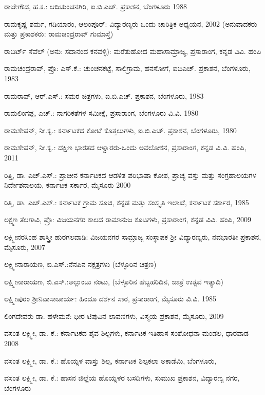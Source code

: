 \noindent
ರಾಜೇಗೌಡ, ಹ.ಕ.: ಆದಿಚುಂಚನಗಿರಿ, ಐ.ಬಿ.ಎಚ್​. ಪ್ರಕಾಶನ, ಬೆಂಗಳೂರು 1988

\noindent
ರಾಮಕೃಷ್ಣ ಶರ್ಮ, ಗಡಿಯಾರಂ, ಆಲಂಪೂರ್​: ವಿದ್ಯಾರಣ್ಯರು ಒಂದು ಚಾರಿತ್ರಿಕ ಅಧ್ಯಯನ, 2002 (ಅನುವಾದಕರು ಮತ್ತು ಪ್ರಕಾಶಕರು: ರಾಮಚಂದ್ರರಾವ್​ ಗುಮಾಸ್ತೆ)

\noindent
ರಾಬರ್ಟ್ ಸೆವೆಲ್​ (ಅನು: ಸದಾನಂದ ಕನವಳ್ಳಿ): ಮರೆತುಹೋದ ಮಹಾಸಾಮ್ರಾಜ್ಯ, ಪ್ರಸಾರಾಂಗ, ಕನ್ನಡ ವಿವಿ. ಹಂಪಿ

\noindent
ರಾಮಚಂದ್ರರಾವ್​, ಪ್ರೊ: ಎಸ್​.ಕೆ.: ಚುಂಚನಕಟ್ಟೆ, ಸಾಲಿಗ್ರಾಮ, ಹನಸೋಗೆ, ಐಬಿಎಚ್​. ಪ್ರಕಾಶನ, ಬೆಂಗಳೂರು, 1983

\noindent
ರಾಮರಾವ್​, ಆರ್​.ಎಸ್​.: ಸಮರ ಚಿತ್ರಗಳು, ಐ.ಬಿ.ಎಚ್​. ಪ್ರಕಾಶನ, ಬೆಂಗಳೂರು, 1983

\noindent
ರಾಮಲಿಂಗಪ್ಪ, ಎಚ್​.: ನಾಗರಿಕತೆಗಳ ಸಮೀಕ್ಷೆ, ಪ್ರಸಾರಾಂಗ, ಬೆಂಗಳೂರು ವಿ.ವಿ. 1980

\noindent
ರಾಮಶೇಷನ್​, ನೀ.ಕೃ.: ಕರ್ನಾಟಕದ ಕೋಟೆ ಕೊತ್ತಲುಗಳು, ಐ.ಬಿ.ಎಚ್​. ಪ್ರಕಾಶನ, ಬೆಂಗಳೂರು, 1980

\noindent
ರಾಮಶೇಷನ್​, ನೀ.ಕೃ.: ದಕ್ಷಿಣ ಭಾರತದ ಆಳ್ವಾರರು-ಒಂದು ಅವಲೋಕನ, ಪ್ರಸಾರಾಂಗ, ಕನ್ನಡ ವಿ.ವಿ. ಹಂಪಿ, 2011

\noindent
ರಿತ್ತಿ, ಡಾ. ಎಚ್​.ಎಸ್​.: ಪ್ರಾಚೀನ ಕರ್ನಾಟಕದ ಆಡಳಿತ ಪರಿಭಾಷಾ ಕೋಶ, ಪ್ರಾಚ್ಯ ವಸ್ತು ಮತ್ತು ಸಂಗ್ರಹಾಲಯಗಳ ನಿರ್ದೇಶನಾಲಯ, ಕರ್ನಾಟಕ ಸರ್ಕಾರ, ಮೈಸೂರು 2000

\noindent
ರಿತ್ತಿ, ಡಾ. ಎಚ್​.ಎಸ್​.: ಕರ್ನಾಟಕ ಗ್ರಾಮ ಸೂಚಿ, ಕನ್ನಡ ಮತ್ತು ಸಂಸ್ಕೃತಿ ಇಲಾಖೆ, ಕರ್ನಾಟಕ ಸರ್ಕಾರ, 1985

\noindent
ಲಕ್ಷ್ಮಣ ತೆಲಗಾವಿ, ಪ್ರೊ: ವಿಜಯನಗರ ಕಾಲದ ರಾಮಾನುಜ ಕೂಟಗಳು, ಪ್ರಸಾರಾಂಗ, ಕನ್ನಡ ವಿವಿ. ಹಂಪಿ, 2009

\noindent
ಲಕ್ಷ್ಮೀನರಸಿಂಹ ಶಾಸ್ತ್ರೀ ಹುರಗಲವಾಡಿ: ವಿಜಯನಗರ ಸಾಮ್ರಾಜ್ಯ ಸಂಸ್ಥಾಪಕ ಶ‍್ರೀ ವಿದ್ಯಾರಣ್ಯರು, ನವಭಾರತೀ ಪ್ರಕಾಶನ, ಮೈಸೂರು, 2007

\noindent
ಲಕ್ಷ್ಮೀನಾರಾಯಣ, ಬಿ.ಎಸ್​.:ನೆನಪಿನ ನಕ್ಷತ್ರಗಳು (ಬೆಳ್ಳೂರಿನ ಚಿತ್ರಣ)

\noindent
ಲಕ್ಷ್ಮೀನಾರಾಯಣ, ಬಿ.ಎಸ್​.:ಅಲ್ಲುಂಟು ನಂಟು, (ಬೆಳ್ಳೂರಿನ ಹಬ್ಬಹರಿದಿನ, ಜಾತ್ರೆ ಉತ್ಸವ ಇತ್ಯಾದಿ) 

\noindent
ಲಕ್ಷ್ಮೀಪುರಂ ಶ‍್ರೀನಿವಾಸಾಚಾರ್ಯ: ಹಿಂದೂ ದರ್ಶನ ಸಾರ, ಪ್ರಸಾರಾಂಗ, ಮೈಸೂರು ವಿ.ವಿ. 1985

\noindent
ಲಿಂಗದೇವರು ಡಾ. ಹಳೇಮನೆ: ಧೀರ ಟಿಪುವಿನ ಲಾವಣಿಗಳು, ವಿಸ್ಮಯ ಪ್ರಕಾಶನ, ಮೈಸೂರು, 2009

\noindent
ವಸಂತ ಲಕ್ಷ್ಮೀ, ಡಾ. ಕೆ.: ಕರ್ನಾಟಕದ ಶೈವ ಶಿಲ್ಪಗಳು, ಕರ್ನಾಟಕ ಇತಿಹಾಸ ಸಂಶೋಧನಾ ಮಂಡಲ, ಧಾರವಾಡ 2008

\noindent
ವಸಂತ ಲಕ್ಷ್ಮೀ, ಡಾ. ಕೆ.: ಹೊಯ್ಸಳ ವಾಸ್ತು ಶಿಲ್ಪ, ಕರ್ನಾಟಕ ಶಿಲ್ಪಕಲಾ ಅಕಾಡೆಮಿ, ಬೆಂಗಳೂರು, 

\noindent
ವಸಂತ ಲಕ್ಷ್ಮೀ, ಡಾ. ಕೆ.: ಹಾಸನ ಜಿಲ್ಲೆಯ ಹೊಯ್ಸಳರ ಬಸದಿಗಳು, ಸುಮುಖ ಪ್ರಕಾಶನ, ವಿದ್ಯಾರಣ್ಯ ನಗರ, ಬೆಂಗಳೂರು

